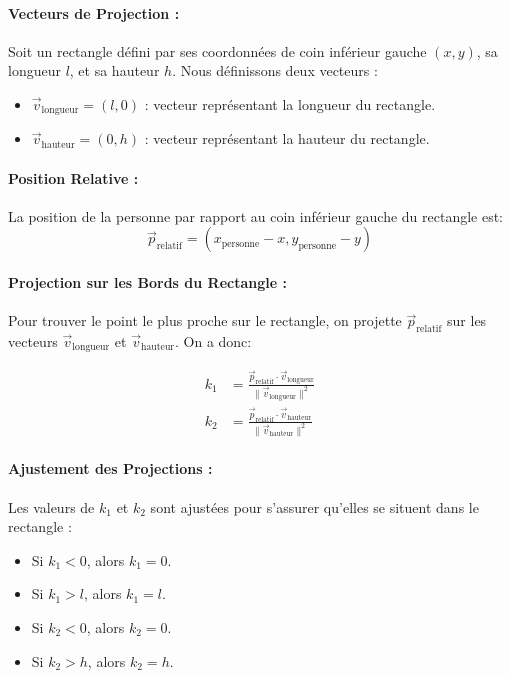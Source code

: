 \documentclass[a4paper,12pt]{article}
\begin{document}
\paragraph{Vecteurs de Projection :}

Soit un rectangle défini par ses coordonnées de coin inférieur gauche $(x, y)$, sa longueur $l$, et sa hauteur $h$. Nous définissons deux vecteurs :
\begin{itemize}
    \item $\vec{v}_{\text{longueur}} = (l, 0)$ : vecteur représentant la longueur du rectangle.
    \item $\vec{v}_{\text{hauteur}} = (0, h)$ : vecteur représentant la hauteur du rectangle.
\end{itemize}

\paragraph{Position Relative :}

La position de la personne par rapport au coin inférieur gauche du rectangle est:
\[
\vec{p}_{\text{relatif}} = (x_{\text{personne}} - x, y_{\text{personne}} - y)
\]

\paragraph{Projection sur les Bords du Rectangle :}

Pour trouver le point le plus proche sur le rectangle, on projette $\vec{p}_{\text{relatif}}$ sur les vecteurs $\vec{v}_{\text{longueur}}$ et $\vec{v}_{\text{hauteur}}$. On a donc:

\begin{align*}
k_1 &= \frac{\vec{p}_{\text{relatif}} \cdot \vec{v}_{\text{longueur}}}{\|\vec{v}_{\text{longueur}}\|^2} \\
k_2 &= \frac{\vec{p}_{\text{relatif}} \cdot \vec{v}_{\text{hauteur}}}{\|\vec{v}_{\text{hauteur}}\|^2}
\end{align*}

\paragraph{Ajustement des Projections :}

Les valeurs de $k_1$ et $k_2$ sont ajustées pour s'assurer qu'elles se situent dans le rectangle :
\begin{itemize}
    \item Si $k_1 < 0$, alors $k_1 = 0$.
    \item Si $k_1 > l$, alors $k_1 = l$.
    \item Si $k_2 < 0$, alors $k_2 = 0$.
    \item Si $k_2 > h$, alors $k_2 = h$.
\end{itemize}
\end{document}

